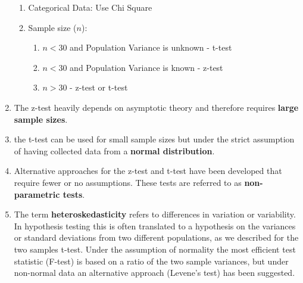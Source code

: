 \begin{enumerate}
    \begin{enumerate}
        \item Categorical Data: Use Chi Square
        \hfill \cite{ctl.unm.edu/assets/docs/resources/hypothesis-testing-sheet.pdf}

        \item Sample size ($n$):
        \begin{enumerate}
            \item $n < 30$ and Population Variance is unknown - t-test
            \hfill \cite{ctl.unm.edu/assets/docs/resources/hypothesis-testing-sheet.pdf}

            \item $n < 30$ and Population Variance is known - z-test
            \hfill \cite{ctl.unm.edu/assets/docs/resources/hypothesis-testing-sheet.pdf}

            \item $n > 30$ - z-test or t-test
            \hfill \cite{ctl.unm.edu/assets/docs/resources/hypothesis-testing-sheet.pdf}
        \end{enumerate}
    \end{enumerate}

    \item The z-test heavily depends on asymptotic theory and therefore requires \textbf{large sample sizes}.
    \hfill \cite{statistics/book/Statistics-for-Data-Scientists/Maurits-Kaptein}

    \item the t-test can be used for small sample sizes but under the strict assumption of having collected data from a \textbf{normal distribution}.
    \hfill \cite{statistics/book/Statistics-for-Data-Scientists/Maurits-Kaptein}

    \item Alternative approaches for the z-test and t-test have been developed that require fewer or no assumptions. These tests are referred to as \textbf{non-parametric tests}.
    \hfill \cite{statistics/book/Statistics-for-Data-Scientists/Maurits-Kaptein}

    \item The term \textbf{heteroskedasticity} refers to differences in variation or variability. 
    In hypothesis testing this is often translated to a hypothesis on the variances or standard deviations from two different populations, as we described for the two samples t-test.
    Under the assumption of normality the most efficient test statistic (F-test) is based on a ratio of the two sample variances, but under non-normal data an alternative approach (Levene’s test) has been suggested. 
    \hfill \cite{statistics/book/Statistics-for-Data-Scientists/Maurits-Kaptein}
\end{enumerate}


